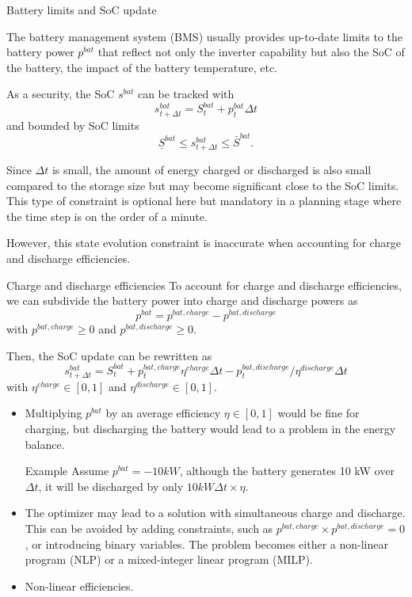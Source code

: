 \begin{frame}[allowframebreaks]{Battery limits and SoC update}

    The battery management system (BMS) usually provides up-to-date limits to the battery power $p^{bat}$ that reflect not only the inverter capability but also the SoC of the battery, the impact of the battery temperature, etc.
    
    As a security, the SoC $s^{bat}$ can be tracked with 
    $$s^{bat}_{t+\Delta t} = S^{bat}_{t} + p^{bat}_t  \Delta t$$
    and bounded by SoC limits
    $$ \underline{S}^{bat} \leq s^{bat}_{t+\Delta t} \leq \bar{S}^{bat}.$$

    Since $\Delta t$ is small, the amount of energy charged or discharged is also small compared to the storage size but may become significant close to the SoC limits.
    This type of constraint is optional here but mandatory in a planning stage where the time step is on the order of a minute.

    However, this state evolution constraint is inaccurate when accounting for charge and discharge efficiencies.
\end{frame}

\begin{frame}[allowframebreaks]{Charge and discharge efficiencies}
    To account for charge and discharge efficiencies, we can subdivide the battery power into charge and discharge powers as 
    $$ p^{bat} = p^{bat, charge} - p^{bat, discharge}$$
    with $p^{bat, charge} \geq 0$ and $p^{bat, discharge} \geq 0$.

    Then, the SoC update can be rewritten as
    $$s^{bat}_{t+\Delta t} = S^{bat}_{t} + p^{bat, charge}_t  \eta^{charge} \Delta t - p^{bat, discharge}_t / \eta^{discharge} \Delta t $$
    with $\eta^{charge} \in [0,1]$ and $\eta^{discharge} \in [0,1]$.

    \begin{itemize}
        \item Multiplying $p^{bat}$ by an average efficiency $\eta \in [0,1]$ would be fine for charging, but discharging the battery would lead to a problem in the energy balance.
        \begin{block}{Example}
            Assume $p^{bat} = -10 kW$, although the battery generates 10 kW over $\Delta t$, it will be discharged by only $10 kW \Delta t \times \eta$.    
        \end{block}
        \item The optimizer may lead to a solution with simultaneous charge and discharge. 
        This can be avoided by adding constraints, such as $p^{bat, charge} \times p^{bat, discharge} = 0$, or introducing binary variables. The problem becomes either a non-linear program (NLP) or a mixed-integer linear program (MILP).
        \item Non-linear efficiencies.
    \end{itemize}
\end{frame}

